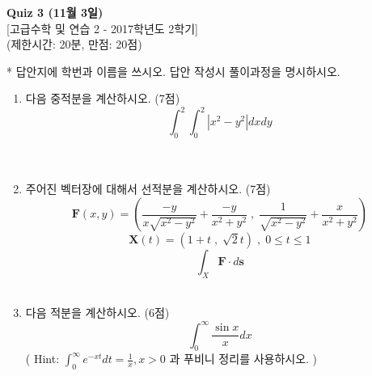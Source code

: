 \documentclass[12pt]{article}
\begin{document}
\begin{center}
\textbf{Quiz 3 (11월 3일)}\\
{[고급수학 및 연습 2 - 2017학년도 2학기]}\\
(제한시간: 20분, 만점: 20점)\\
\end{center}

* 답안지에 학번과 이름을 쓰시오. 답안 작성시 풀이과정을 명시하시오.\\

\begin{enumerate}
\item 다음 중적분을 계산하시오. (7점) $$\int_0^2\int_0^2 \left|x^2-y^2\right| dxdy$$
~\\\\
\item 주어진 벡터장에 대해서 선적분을 계산하시오. (7점)
$$\mathrm{\mathbf{F}}(x, y) = \left(\frac{-y}{x\sqrt{x^2-y^2}} + \frac{-y}{x^2+y^2} \;,\; \frac{1}{\sqrt{x^2-y^2}} + \frac{x}{x^2+y^2}\right)$$ 
$$\mathrm{\mathbf{X}}(t) = \left(1+t \;, \; \sqrt{2}t\right) \;, \; 0\leq t\leq 1$$
$$\int_X \mathrm{\mathbf{F}}\cdot d\mathrm{\mathbf{s}}$$
~\\
\item 다음 적분을 계산하시오. (6점)
$$\int_0^\infty \frac{\sin x}{x}dx$$
( Hint: $\displaystyle \int_0^\infty e^{-xt}dt =\frac{1}{x}, x>0$ 과 푸비니 정리를 사용하시오. )


\end{enumerate}
\end{document}
